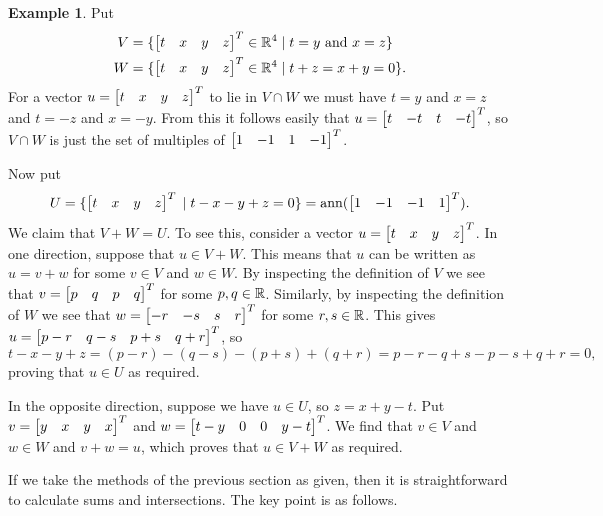 \documentclass[reqno]{amsart}
\theoremstyle{definition}
\newtheorem{example}[theorem]{Example}
\begin{document}
\begin{example}\label{eg-sum-meet-ii}
 Put
 \begin{align*}
  V &= \{\left[\begin{matrix} t&x&y&z\end{matrix}\right]^T\in{\mathbb{R}}^4\;|\; t=y \text{ and } x=z\} \\
  W &= \{\left[\begin{matrix} t&x&y&z\end{matrix}\right]^T\in{\mathbb{R}}^4\;|\; t+z=x+y=0\}.
 \end{align*}
 For a vector $u=\left[\begin{matrix} t&x&y&z\end{matrix}\right]^T$ to lie in $V\cap W$ we must have
 $t=y$ and $x=z$ and $t=-z$ and $x=-y$.  From this it follows easily
 that $u=\left[\begin{matrix} t&-t&t&-t\end{matrix}\right]^T$, so $V\cap W$ is just the set of
 multiples of $\left[\begin{matrix} 1&-1&1&-1\end{matrix}\right]^T$.

 Now put
 \[ U = \{\left[\begin{matrix} t&x&y&z\end{matrix}\right]^T \;|\; t-x-y+z=0\}
      = \operatorname{ann}(\left[\begin{matrix} 1&-1&-1&1\end{matrix}\right]^T).
 \]
 We claim that $V+W=U$.  To see this, consider a vector
 $u=\left[\begin{matrix} t&x&y&z\end{matrix}\right]^T$.   In one direction, suppose that $u\in V+W$.
 This means that $u$ can be written as $u=v+w$ for some $v\in V$ and
 $w\in W$.  By inspecting the definition of $V$ we see that
 $v=\left[\begin{matrix} p&q&p&q\end{matrix}\right]^T$ for some $p,q\in{\mathbb{R}}$.  Similarly, by inspecting
 the definition of $W$ we see that $w=\left[\begin{matrix} -r&-s&s&r\end{matrix}\right]^T$ for some
 $r,s\in{\mathbb{R}}$.  This gives $u=\left[\begin{matrix} p-r&q-s&p+s&q+r\end{matrix}\right]^T$, so
 \[ t-x-y+z = (p-r)-(q-s)-(p+s)+(q+r)
     =p-r-q+s-p-s+q+r = 0,
 \]
 proving that $u\in U$ as required.

 In the opposite direction, suppose we have $u\in U$, so $z=x+y-t$.
 Put $v=\left[\begin{matrix} y&x&y&x\end{matrix}\right]^T$ and $w=\left[\begin{matrix} t-y&0&0&y-t\end{matrix}\right]^T$.  We find
 that $v\in V$ and $w\in W$ and $v+w=u$, which proves that $u\in V+W$
 as required.
\end{example}

If we take the methods of the previous section as given, then it is
straightforward to calculate sums and intersections.  The key point is
as follows.
\end{document}
